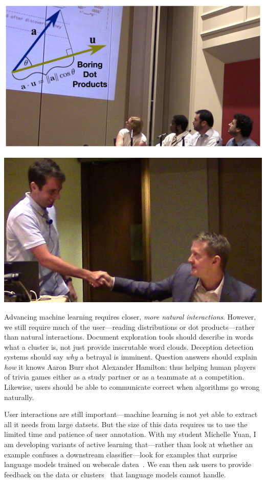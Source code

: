 \documentclass[11pt]{amsart}
\begin{document}
  \begin{minipage}[b]{0.4\textwidth}
    \includegraphics[width=\textwidth]{images/boring_dot_products}
  \end{minipage}
  \hfill
\begin{minipage}[b]{0.4\textwidth}
    \includegraphics[width=\textwidth]{images/jennings_handshake}
  \end{minipage}

Advancing machine learning requires closer, \emph{more natural interactions}.
However, we still require much of the user---reading distributions or dot
products---rather than natural interactions. Document exploration tools should
describe in words what a cluster is, not just provide inscrutable word clouds.
Deception detection systems should say \emph{why} a betrayal is imminent.
Question answers should explain \emph{how} it knows Aaron Burr shot Alexander
Hamilton: thus helping human players of trivia games either as a study partner
or as a teammate at a competition. Likewise, users should be able to
communicate correct when algorithms go wrong naturally.

User interactions are still important---machine learning is not yet able to
extract all it needs from large datsets. But the size of this data requires us
to use the limited time and patience of user annotation. With my
student Michelle Yuan, I am developing
variants of active learning that---rather than look at whether an example
confuses a downstream classifier---look for examples that surprise language
models trained on webscale datea~\cite{devlin-19}. We can then ask users to
provide feedback on the data or clusters~\cite{poursabzi-16} that language
models cannot handle.
\end{document}
